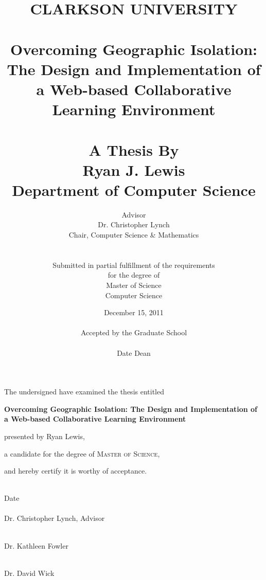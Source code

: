 \documentclass[letterpaper,12pt]{report}
\title{CLARKSON UNIVERSITY \\
\ \\
Overcoming Geographic Isolation: The Design and Implementation of a Web-based Collaborative Learning Environment \\ 
\ \\
\large{A Thesis By \\
\textbf{Ryan J. Lewis} \\
Department of Computer Science \\
}}
\author{Advisor \\
Dr. 	Christopher Lynch \\
Chair, Computer Science \& Mathematics \\
\ \\ \\
Submitted in partial fulfillment of the requirements \\
for the degree of \\
Master of Science \\
Computer Science}
\date{December 15, 2011 \\
\ \\
Accepted by the Graduate School \\
\vspace{.5in}
\hrulefill \\
Date \hspace{2in} Dean
}
\begin{document}
\maketitle

\newpage
\thispagestyle{empty}
\begin{center}
The undersigned have examined the thesis entitled

\vspace{0.4in}

\textbf{Overcoming Geographic Isolation: The Design and Implementation of a Web-based Collaborative Learning Environment}

\vspace{0.4in}

presented by Ryan Lewis,

\vspace{0.4in}

a candidate for the degree of \textsc{Master of Science},

\vspace{0.4in}

and hereby certify it is worthy of acceptance.

\vspace{0.5in}
\hrulefill \\

Date \\
\vspace{0.5in}
\hrulefill \\
\hfill Dr. Christopher Lynch, Advisor

\vspace{0.5in}
\hrulefill \\
\hfill Dr. Kathleen Fowler

\vspace{0.5in}
\hrulefill \\
\hfill Dr. David Wick
\end{center}


\cleardoublepage


\tableofcontents
\listoffigures

\cleardoublepage


\doublespacing







\singlespacing

\raggedright



\doublespacing

\begin{appendices}
%

\end{appendices}
\end{document}
